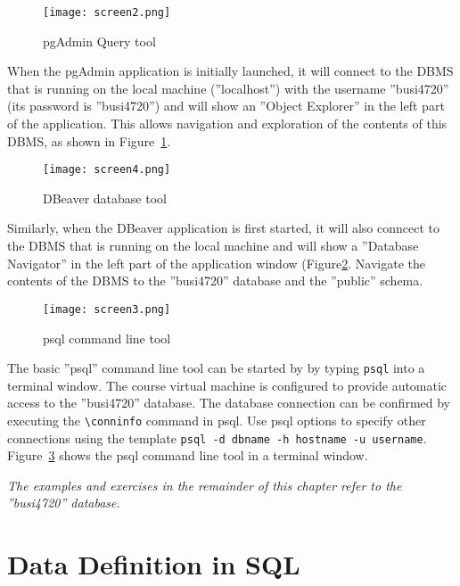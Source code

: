 \begin{figure}
\centering
\texttt{[image: screen2.png]}
\caption{pgAdmin Query tool}
\label{fig:querytool}
\end{figure}

When the pgAdmin application is initially launched, it will connect to the DBMS that is running on the local machine (''localhost'') with the username ''busi4720'' (its password is ''busi4720'') and will show an ''Object Explorer'' in the left part of the application. This allows navigation and exploration of the contents of this DBMS, as shown in Figure~\ref{fig:querytool}.

\begin{figure}
\centering
\texttt{[image: screen4.png]}
\caption{DBeaver database tool}
\label{fig:dbeaver}
\end{figure}

Similarly, when the DBeaver application is first started, it will also conncect to the DBMS that is running on the local machine and will show a ''Database Navigator'' in the left part of the application window (Figure\ref{fig:dbeaver}. Navigate the contents of the DBMS to the ''busi4720'' database and the ''public'' schema.

\begin{figure}
\centering
\texttt{[image: screen3.png]}
\caption{psql command line tool}
\label{fig:psql}
\end{figure}

The basic ''psql'' command line tool can be started by by typing \texttt{psql} into a terminal window. The course virtual machine is configured to provide automatic access to the ''busi4720'' database. The database connection can be confirmed by executing the \texttt{\textbackslash conninfo} command in psql. Use psql options to specify other connections using the template \texttt{psql -d dbname -h hostname -u username}. Figure~\ref{fig:psql} shows the psql command line tool in a terminal window.

\begin{alertbox}
\noindent \emph{The examples and exercises in the remainder of this chapter refer to the ''busi4720'' database.}
\end{alertbox}

\section{Data Definition in SQL}

